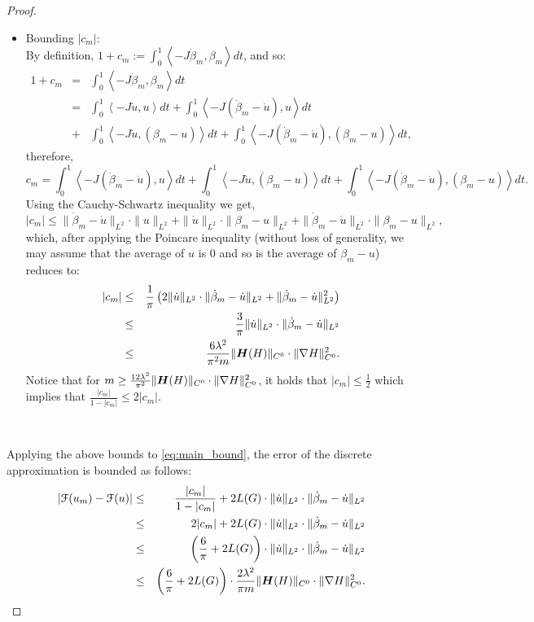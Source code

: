 \documentclass[../capacities_main.tex]{subfiles}
\begin{document}
\begin{proof}
\begin{itemize}
	\item Bounding {$|c_m|$}:\\
		By definition, $1+c_m:=\int_0^1 \left<-J\dot\beta_m,\beta_m\right>dt$, and so:
	 	\begin{eqnarray*}
	 	1+c_m &=& \int_0^1 \left<-J\dot\beta_m,\beta_m\right>dt \\
	 	&=& \int_0^1 \left<-J\dot u,u\right>dt + \int_0^1 \left<-J(\dot\beta_m-\dot u),u\right>dt\\
	 	&+& \int_0^1 \left<-J\dot u,(\beta_m-u)\right>dt + \int_0^1 \left<-J(\dot\beta_m-\dot u),(\beta_m-u)\right>dt,
	 	\end{eqnarray*}
	 	therefore,
	 	\[
	 	c_m = \int_0^1 \left<-J(\dot\beta_m-\dot u),u\right>dt + \int_0^1 \left<-J\dot u,(\beta_m-u)\right>dt + \int_0^1 \left<-J(\dot\beta_m-\dot u),(\beta_m-u)\right>dt.
	 	\]
	 	Using the Cauchy-Schwartz inequality we get,
	 	\[
	 	|c_m| \leq \|\dot\beta_m-\dot u\|_{L^2} \cdot \|u\|_{L^2} + \|\dot u\|_{L^2}\cdot \|\beta_m-u\|_{L^2} + \|\dot\beta_m-\dot u\|_{L^2}\cdot \|\beta_m-u\|_{L^2},
	 	\]
	 	which, after applying the Poincare inequality (without loss of generality, we may assume that the average of $u$ is 0 and so is the average of $\beta_m-u$) reduces to:
	 	\begin{eqnarray*}
	 	|c_m| &\leq& \frac{1}{\pi} \left(2 \|\dot u\|_{L^2}\cdot \|\dot\beta_m-\dot u\|_{L^2} + \|\dot\beta_m-\dot u\|_{L^2}^2\right)\\
	 	&\leq& \frac{3}{\pi} \|\dot u\|_{L^2}\cdot \|\dot\beta_m-\dot u\|_{L^2}\\
	 	&\leq& \frac{6\lambda^2}{\pi^2 m}\|\boldsymbol{H} (H)\|_{C^0}\cdot \|\nabla H\|^2_{C^0}.
	 	\end{eqnarray*}
	 	Notice that for $m\geq\frac{12\lambda^2}{\pi^2 }\|\boldsymbol{H} (H)\|_{C^0}\cdot \|\nabla H\|^2_{C^0} $, it holds that $|c_m|\leq \frac{1}{2}$ which implies that $\frac{|c_m|}{1-|c_m|}\leq 2|c_m|$.

	 \end{itemize}\

	
	Applying the above bounds to \autoref{eq:main_bound}, the error of the discrete approximation is bounded as follows:
	\begin{eqnarray*}
	|{\mathcal F}(u_m)-{\mathcal F}(u)| &\leq& \frac{|c_m|}{1-|c_m|} + 2 L(G) \cdot \|\dot u\|_{L^2}\cdot \|\dot \beta_m - \dot u\|_{L^2}\\ 
	&\leq& 2|c_m| + 2 L(G) \cdot \|\dot u\|_{L^2}\cdot \|\dot \beta_m - \dot u\|_{L^2}\\ 
	&\leq& \left(\frac{6}{\pi}  +2 L(G)\right) \cdot \|\dot u\|_{L^2}\cdot \|\dot \beta_m - \dot u\|_{L^2}\\
	&\leq& \left(\frac{6}{\pi}  +2 L(G)\right) \cdot \frac{2\lambda^2}{\pi m}\|\boldsymbol{H} (H)\|_{C^0}\cdot \|\nabla H\|^2_{C^0}.
	\end{eqnarray*}
	
\end{proof}\
\end{document}
